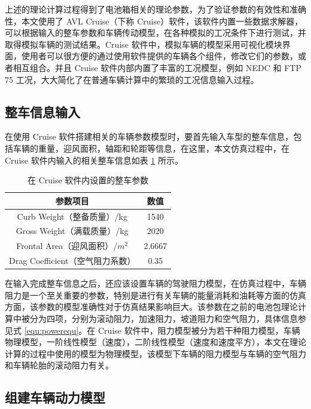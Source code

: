 上述的理论计算过程得到了电池箱相关的理论参数，为了验证参数的有效性和准确性，本文使用了 AVL Cruise（下称 Cruise）软件，该软件内置一些数据求解器，可以根据输入的整车参数和车辆传动模型，在各种模拟的工况条件下进行测试，并取得模拟车辆的测试结果。Cruise 软件中，模拟车辆的模型采用可视化模块界面，使用者可以很方便的通过使用软件提供的车辆各个组件，修改它们的参数，或者相互组合。并且 Cruise 软件内部内置了丰富的工况模型，例如 NEDC 和 FTP 75 工况，大大简化了在普通车辆计算中的繁琐的工况信息输入过程。

\subsection{整车信息输入}

在使用 Cruise 软件搭建相关的车辆参数模型时，要首先输入车型的整车信息，包括车辆的重量，迎风面积，轴距和轮距等信息，在这里，本文仿真过程中，在 Cruise 软件内输入的相关整车信息如表 \ref{tab:carinfo} 所示。

\begin{table}
	\centering
	\caption{在 Cruise 软件内设置的整车参数} \label{tab:carinfo}
	\begin{tabular*}{0.9\textwidth}{@{\extracolsep{\fill}}cc}
		\toprule
		参数项目			&数值		 \\
		\midrule
		Curb Weight（整备质量）/kg	     &1540  \\
		Gross Weight（满载质量）/kg     &2020  \\
		Frontal Area（迎风面积）/$m^2$      &2.6667\\
		Drag Coefficient（空气阻力系数）     &0.35  \\
		\bottomrule
	\end{tabular*}
\end{table}

在输入完成整车信息之后，还应该设置车辆的驾驶阻力模型，在仿真过程中，车辆阻力是一个至关重要的参数，特别是进行有关车辆的能量消耗和油耗等方面的仿真方面，该参数的模型准确性对于仿真结果影响巨大。该参数在之前的电池包理论计算中被分为四项，分别为滚动阻力，加速阻力，坡道阻力和空气阻力，具体信息参见式 \ref{equ:powerequ}。在 Cruise 软件中，阻力模型被分为若干种阻力模型，车辆物理模型，一阶线性模型（速度），二阶线性模型（速度和速度平方），本文在理论计算的过程中使用的模型为物理模型，该模型下车辆的阻力模型与车辆的空气阻力和车辆轮胎的滚动阻力有关。

\subsection{组建车辆动力模型}

